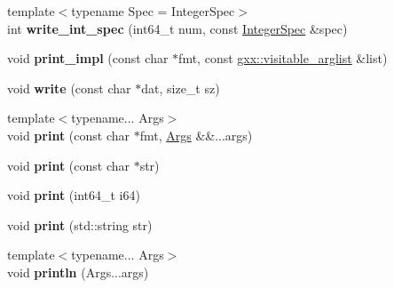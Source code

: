 \begin{DoxyCompactItemize}
\item 
{\footnotesize template$<$typename Spec  = Integer\+Spec$>$ }\\int {\bfseries write\+\_\+int\+\_\+spec} (int64\+\_\+t num, const \hyperlink{classgxx_1_1io_1_1IntegerSpec}{Integer\+Spec} \&spec)\hypertarget{classgxx_1_1io_1_1format__writer_ad142c2af00de5de8420250bedc2ae445}{}\label{classgxx_1_1io_1_1format__writer_ad142c2af00de5de8420250bedc2ae445}

\item 
void {\bfseries print\+\_\+impl} (const char $\ast$fmt, const \hyperlink{classgxx_1_1visitable__arglist}{gxx\+::visitable\+\_\+arglist} \&list)\hypertarget{classgxx_1_1io_1_1format__writer_a3eee8456b416a3fd51b17cb616c358df}{}\label{classgxx_1_1io_1_1format__writer_a3eee8456b416a3fd51b17cb616c358df}

\item 
void {\bfseries write} (const char $\ast$dat, size\+\_\+t sz)\hypertarget{classgxx_1_1io_1_1format__writer_a9e2e3248af80fb6924ffd1c8da40945b}{}\label{classgxx_1_1io_1_1format__writer_a9e2e3248af80fb6924ffd1c8da40945b}

\item 
{\footnotesize template$<$typename... Args$>$ }\\void {\bfseries print} (const char $\ast$fmt, \hyperlink{structArgs}{Args} \&\&...args)\hypertarget{classgxx_1_1io_1_1format__writer_a8e74d35d303875e1b1c5f2cb0d768a17}{}\label{classgxx_1_1io_1_1format__writer_a8e74d35d303875e1b1c5f2cb0d768a17}

\item 
void {\bfseries print} (const char $\ast$str)\hypertarget{classgxx_1_1io_1_1format__writer_a400643ef00c00601f672569d73882b71}{}\label{classgxx_1_1io_1_1format__writer_a400643ef00c00601f672569d73882b71}

\item 
void {\bfseries print} (int64\+\_\+t i64)\hypertarget{classgxx_1_1io_1_1format__writer_ac8e4b083a41ac2a6efe20c439d46f42d}{}\label{classgxx_1_1io_1_1format__writer_ac8e4b083a41ac2a6efe20c439d46f42d}

\item 
void {\bfseries print} (std\+::string str)\hypertarget{classgxx_1_1io_1_1format__writer_a6cf311ce55a9940752f5aa32f5ecf980}{}\label{classgxx_1_1io_1_1format__writer_a6cf311ce55a9940752f5aa32f5ecf980}

\item 
{\footnotesize template$<$typename... Args$>$ }\\void {\bfseries println} (Args...\+args)\hypertarget{classgxx_1_1io_1_1format__writer_abc83ba815281c94ec2a5c9cd9550de3b}{}\label{classgxx_1_1io_1_1format__writer_abc83ba815281c94ec2a5c9cd9550de3b}


\end{DoxyCompactItemize}
